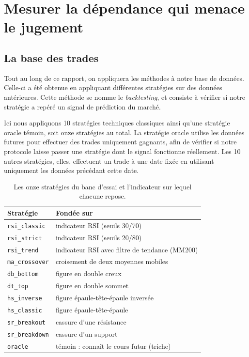 \chapter{Mesurer la dépendance qui menace le jugement}
\label{chap:donnees}

\section{La base des trades}
\label{sec:donnees-trades}


Tout au long de ce rapport, on appliquera les méthodes à notre base
de données. Celle-ci a été obtenue en appliquant différentes stratégies
sur des données antérieures. Cette méthode se nomme le \emph{backtesting}, et
consiste à vérifier si notre stratégie a repéré un signal de prédiction
du marché.

Ici nous appliquons 10 stratégies techniques classiques ainsi qu'une stratégie
oracle témoin, soit onze stratégies au total.
La stratégie oracle utilise les données futures pour effectuer des
trades uniquement gagnants, afin de vérifier si notre protocole laisse passer
une stratégie dont le signal fonctionne réellement.
Les 10 autres stratégies, elles, effectuent un trade à une date fixée en
utilisant uniquement les données précédant cette date. 

\begin{table}[H]
\centering
\caption{Les onze stratégies du banc d'essai et l'indicateur sur lequel chacune repose.}
\label{tab:strategies}
\renewcommand{\arraystretch}{1.25}
\small
\begin{tabular}{@{}ll@{}}
\toprule
Stratégie & Fondée sur \\
\midrule
\texttt{rsi\_classic}  & indicateur RSI (seuils 30/70) \\
\texttt{rsi\_strict}   & indicateur RSI (seuils 20/80) \\
\texttt{rsi\_trend}    & indicateur RSI avec filtre de tendance (MM200) \\
\texttt{ma\_crossover} & croisement de deux moyennes mobiles \\
\texttt{db\_bottom}    & figure en double creux \\
\texttt{dt\_top}       & figure en double sommet \\
\texttt{hs\_inverse}   & figure épaule-tête-épaule inversée \\
\texttt{hs\_classic}   & figure épaule-tête-épaule \\
\texttt{sr\_breakout}  & cassure d'une résistance \\
\texttt{sr\_breakdown} & cassure d'un support \\
\midrule
\texttt{oracle}        & témoin : connaît le cours futur (triche) \\
\bottomrule
\end{tabular}
\end{table}

